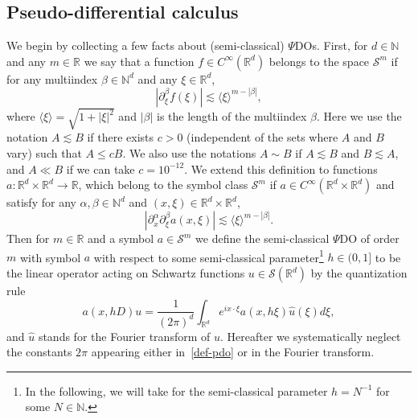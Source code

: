 \documentclass[AHL,Unicode,longabstracts,published]{cedram}
\newcommand{\R}{\mathbb{R}}
\newcommand{\N}{\mathbb{N}}
\renewcommand{\S}{\mathcal{S}}
\newcommand{\les}{\lesssim}
\newcommand{\jb}[1] {\langle #1 \rangle}
\begin{document}
\subsection{Pseudo-differential calculus}
We begin by collecting a few facts about (semi-classical) $\Psi$DOs. First, for $d\in\N$ and any $m\in\R$ we say that a function $f\in C^{\infty}(\R^d)$ belongs to the space $\S^m$ if for any multiindex $\beta\in\N^d$ and any $\xi\in\R^d$,
\begin{equation}\label{def-Sm}
\left|\partial_{\xi}^{\beta}f(\xi)\right|\les \jb{\xi}^{m-|\beta|},
\end{equation}
where $\jb{\xi}=\sqrt{1+|\xi|^2}$ and $|\beta|$ is the length of the multiindex $\beta$. Here we use the notation $A\les B$ if there exists $c>0$ (independent of the sets where $A$ and $B$ vary) such that $A\leq cB$. We also use the notations $A\sim B$ if $A\les B$ and $B\les A$, and $A\ll B$ if we can take $c=10^{-12}$. We extend this definition to functions $a: \R^d\times\R^d \rightarrow \R$, which belong to the symbol class $\S^m$ if $a \in C^{\infty}(\R^d\times\R^d)$ and satisfy for any $\alpha,\beta\in\N^d$ and $(x,\xi)\in\R^d\times\R^d$,
\begin{equation}\label{def-symbolclass}
\left|\partial_x^{\alpha}\partial_{\xi}^{\beta}a(x,\xi)\right|\les \jb{\xi}^{m-|\beta|}.
\end{equation}
Then for $m\in\R$ and a symbol $a\in\S^m$ we define the semi-classical $\Psi$DO of order $m$ with symbol $a$ with respect to some semi-classical parameter\footnote{ In the following, we will take for the semi-classical parameter $h=N^{-1}$ for some $N\in\N$. } $h\in (0,1]$ to be the linear operator acting on Schwartz functions $u\in \S(\R^d)$ by the quantization rule
\begin{equation}\label{def-pdo}
a(x,hD)u=\frac{1}{(2\pi)^d}\int_{\R^d}e^{ix\cdot\xi}a(x,h\xi)\widehat{u}(\xi)d\xi,
\end{equation}
and $\widehat{u}$ stands for the Fourier transform of $u$. Hereafter we systematically neglect the constants $2\pi$ appearing either in~\eqref{def-pdo} or in the Fourier transform.
\end{document}
